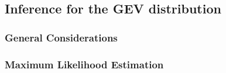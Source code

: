 \documentclass[a4paper,10pt]{article}
\theoremstyle{definition}
\numberwithin{equation}{section}
\begin{document}
\subsection{Inference for the GEV distribution}
\subsubsection{General Considerations}



\subsubsection{Maximum Likelihood Estimation}


%



%	
\end{document}
